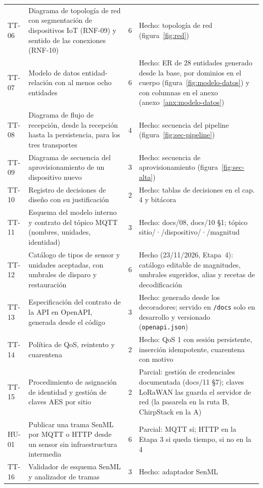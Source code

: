 \begin{longtable}{@{}L{1.2cm}L{4.6cm}C{0.6cm}L{5.4cm}@{}}
TT-06 & Diagrama de topología de red con segmentación de dispositivos IoT (RNF-09) y sentido de las conexiones (RNF-10) & 6 & Hecho: topología de red (figura~\ref{fig:red}) \\
TT-07 & Modelo de datos entidad-relación con al menos ocho entidades & 6 & Hecho: ER de 28 entidades generado desde la base, por dominios en el cuerpo (figura~\ref{fig:modelo-datos}) y con columnas en el anexo (anexo~\ref{anx:modelo-datos}) \\
TT-08 & Diagrama de flujo de recepción, desde la recepción hasta la persistencia, para los tres transportes & 4 & Hecho: secuencia del pipeline (figura~\ref{fig:sec-pipeline}) \\
TT-09 & Diagrama de secuencia del aprovisionamiento de un dispositivo nuevo & 3 & Hecho: secuencia de aprovisionamiento (figura~\ref{fig:sec-alta}) \\
TT-10 & Registro de decisiones de diseño con su justificación & 2 & Hecho: tablas de decisiones en el cap. 4 y bitácora \\
TT-11 & Esquema del modelo interno y contrato del tópico MQTT (nombres, unidades, identidad) & 3 & Hecho: docs/08, docs/10 §1; tópico sitio/·/dispositivo/·/magnitud \\
TT-12 & Catálogo de tipos de sensor y unidades aceptadas, con umbrales de disparo y restauración & 6 & Hecho (23/11/2026, Etapa~4): catálogo editable de magnitudes, umbrales sugeridos, alias y recetas de decodificación \\
TT-13 & Especificación del contrato de la API en OpenAPI, generada desde el código & 3 & Hecho: generado desde los decoradores; servido en \texttt{/docs} solo en desarrollo y versionado (\texttt{openapi.json}) \\
TT-14 & Política de QoS, reintento y cuarentena & 2 & Hecho: QoS 1 con sesión persistente, inserción idempotente, cuarentena con motivo \\
TT-15 & Procedimiento de asignación de identidad y gestión de claves AES por sitio & 2 & Parcial: gestión de credenciales documentada (docs/11 §7); claves LoRaWAN las guarda el servidor de red (la pasarela en la ruta B, ChirpStack en la A) \\
HU-01 & Publicar una trama SenML por MQTT o HTTP desde un sensor sin infraestructura intermedia & 6 & Parcial: MQTT sí; HTTP en la Etapa 3 si queda tiempo, si no en la 4 \\
TT-16 & Validador de esquema SenML y analizador de tramas & 3 & Hecho: adaptador SenML \\

\end{longtable}
